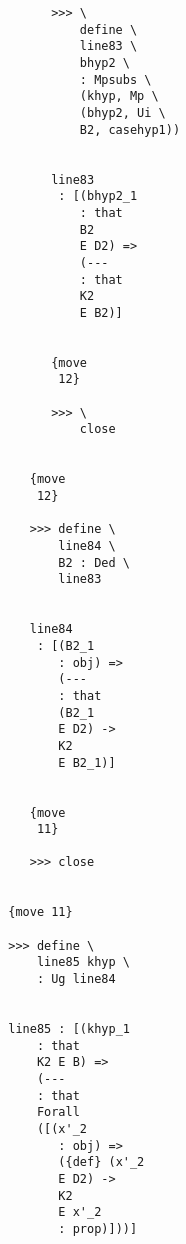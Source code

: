 \documentclass[12pt]{article}
\begin{document}
\begin{verbatim}
                                       >>> \
                                           define \
                                           line83 \
                                           bhyp2 \
                                           : Mpsubs \
                                           (khyp, Mp \
                                           (bhyp2, Ui \
                                           B2, casehyp1))


                                       line83 
                                        : [(bhyp2_1 
                                           : that 
                                           B2 
                                           E D2) => 
                                           (--- 
                                           : that 
                                           K2 
                                           E B2)]


                                       {move 
                                        12}

                                       >>> \
                                           close


                                    {move 
                                     12}

                                    >>> define \
                                        line84 \
                                        B2 : Ded \
                                        line83


                                    line84 
                                     : [(B2_1 
                                        : obj) => 
                                        (--- 
                                        : that 
                                        (B2_1 
                                        E D2) -> 
                                        K2 
                                        E B2_1)]


                                    {move 
                                     11}

                                    >>> close


                                 {move 11}

                                 >>> define \
                                     line85 khyp \
                                     : Ug line84


                                 line85 : [(khyp_1 
                                     : that 
                                     K2 E B) => 
                                     (--- 
                                     : that 
                                     Forall 
                                     ([(x'_2 
                                        : obj) => 
                                        ({def} (x'_2 
                                        E D2) -> 
                                        K2 
                                        E x'_2 
                                        : prop)]))]



\end{verbatim}
\end{document}
